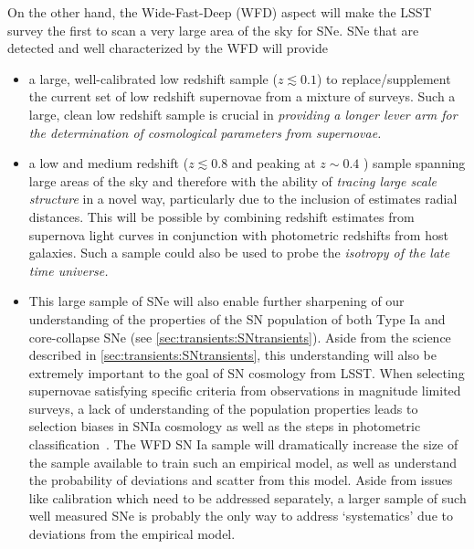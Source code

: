 On the other hand, the Wide-Fast-Deep (WFD) aspect will make the LSST survey
the first to scan a very large area of the sky for SNe. SNe that are detected
and well characterized by the WFD will provide 
\begin{itemize}
    \item a large, well-calibrated low redshift sample ($z \lesssim 0.1$) to replace/supplement the current  set of low redshift supernovae from a mixture of surveys. Such a large, clean low redshift sample is crucial in {\emph{providing a longer lever arm for the determination of cosmological parameters from supernovae.}}
    \item  a low and medium redshift ($z \lesssim 0.8$ and peaking at $z \sim 0.4$ ) sample spanning large areas of 
the sky and therefore with the ability of {\emph{tracing large scale structure}} in a novel way, particularly due to 
the inclusion of estimates radial distances. This will be possible by combining redshift estimates from supernova light 
curves in conjunction with photometric redshifts from host galaxies.  Such a sample could also be used to probe the 
{\emph{isotropy of the late time universe.}}
    \item This large sample of SNe will also enable further sharpening of our understanding of the properties of the SN population of both Type Ia and core-collapse SNe (see \autoref{sec:transients:SNtransients}). Aside from the science described in \autoref{sec:transients:SNtransients}, this understanding will also be extremely important to the goal of SN cosmology from LSST. When selecting supernovae satisfying specific criteria from observations in magnitude limited surveys, a lack of understanding of the population properties leads to selection biases in SNIa cosmology as well as the steps in photometric classification~\cite{2017ApJ...836...56K,2016ApJ...822L..35S}. 
The WFD SN Ia
sample will dramatically increase the size of the sample available to
train such an empirical model, as well as understand the probability of
deviations and scatter from this model. Aside from issues like
calibration which need to be addressed separately, a larger sample of
such well measured SNe is probably the only way to address `systematics'
due to deviations from the empirical model. 
\end{itemize}

